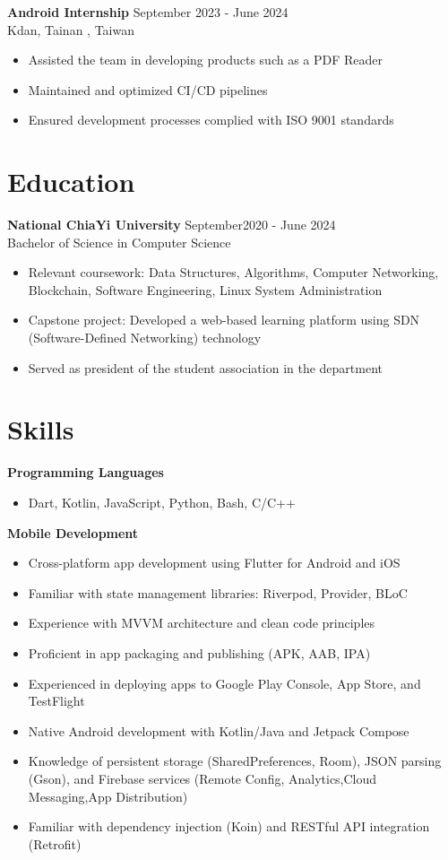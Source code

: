 \documentclass[a4paper,10pt]{article}
\begin{document}
\textbf{Android Internship} \hfill September 2023 - June 2024 \\
Kdan, Tainan , Taiwan
\begin{itemize}[left=0pt, label={--}]
    \item Assisted the team in developing products such as a PDF Reader
    \item Maintained and optimized CI/CD pipelines
    \item Ensured development processes complied with ISO 9001 standards
\end{itemize}

\section*{Education}
\textbf{National ChiaYi University} \hfill September2020 - June 2024 \\
Bachelor of Science in Computer Science

\begin{itemize}[left=0pt, label={--}]
    \item Relevant coursework: Data Structures, Algorithms, Computer Networking, Blockchain, Software Engineering, Linux System Administration
    \item Capstone project: Developed a web-based learning platform using SDN (Software-Defined Networking) technology
    \item Served as president of the student association in the department
\end{itemize}

\section*{Skills}
\textbf{Programming Languages}
\begin{itemize}[left=0pt, label={--}]
    \item Dart, Kotlin, JavaScript, Python, Bash, C/C++
\end{itemize}

\textbf{Mobile Development}
\begin{itemize}[left=0pt, label={--}]
    \item Cross-platform app development using Flutter for Android and iOS
    \item Familiar with state management libraries: Riverpod, Provider, BLoC
    \item Experience with MVVM architecture and clean code principles
    \item Proficient in app packaging and publishing (APK, AAB, IPA)
    \item Experienced in deploying apps to Google Play Console, App Store, and TestFlight
    \item Native Android development with Kotlin/Java and Jetpack Compose
    \item Knowledge of persistent storage (SharedPreferences, Room), JSON parsing (Gson), and Firebase services (Remote Config, Analytics,Cloud Messaging,App Distribution)
    \item Familiar with dependency injection (Koin) and RESTful API integration (Retrofit)
\end{itemize}
\end{document}
